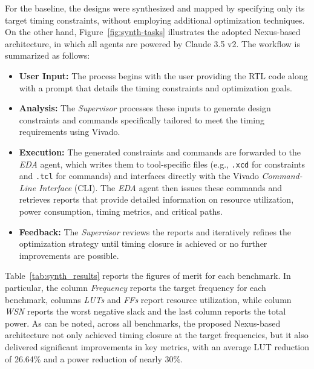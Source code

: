 For the baseline, the designs were synthesized and mapped by specifying only its target timing constraints, without employing additional optimization techniques. On the other hand, Figure~\ref{fig:synth-tasks} illustrates the adopted Nexus-based architecture, in which all agents are powered by Claude 3.5 v2. The workflow is summarized as follows:
\begin{itemize}
\item \textbf{User Input:} The process begins with the user providing the RTL code along with a prompt that details the timing constraints and optimization goals.
\item \textbf{Analysis:} The \emph{Supervisor} processes these inputs to generate design constraints and commands specifically tailored to meet the timing requirements using Vivado.
\item \textbf{Execution:} The generated constraints and commands are forwarded to the \emph{EDA} agent, which writes them to tool-specific files (e.g., {\tt .xcd} for constraints and {\tt .tcl} for commands) and interfaces directly with the Vivado \emph{Command-Line Interface} (CLI). The \emph{EDA} agent then issues these commands and retrieves reports that provide detailed information on resource utilization, power consumption, timing metrics, and critical paths.
\item \textbf{Feedback:} The \emph{Supervisor} reviews the reports and iteratively refines the optimization strategy until timing closure is achieved or no further improvements are possible.
\end{itemize}

Table~\ref{tab:synth_results} reports the figures of merit for each benchmark. In particular, the column {\em Frequency} reports the target frequency for each benchmark, columns {\em LUTs} and {\em FFs} report resource utilization, while column {\em WSN} reports the worst negative slack and the last column reports the total power. As can be noted, across all benchmarks, the proposed Nexus-based architecture not only achieved timing closure at the target frequencies, but it also delivered significant improvements in key metrics, with an average LUT reduction of 26.64\% and a power reduction of nearly 30\%.

